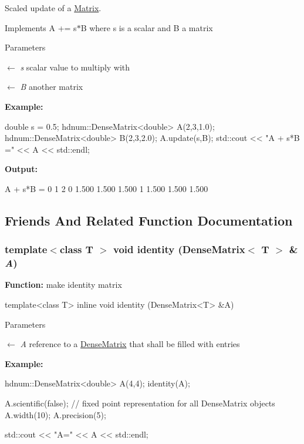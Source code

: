 Scaled update of a \hyperlink{classhdnum_1_1Matrix}{Matrix}. 

Implements A += s$\ast$B where s is a scalar and B a matrix


\begin{DoxyParams}{Parameters}
\item[\mbox{$\leftarrow$} {\em s}]scalar value to multiply with \item[\mbox{$\leftarrow$} {\em B}]another matrix\end{DoxyParams}
{\bfseries Example:} 
\begin{DoxyCode}
          double s = 0.5;
          hdnum::DenseMatrix<double> A(2,3,1.0);
          hdnum::DenseMatrix<double> B(2,3,2.0);
          A.update(s,B);
          std::cout << "A + s*B =" << A << std::endl;
\end{DoxyCode}


{\bfseries Output:} \begin{DoxyVerb}
A + s*B =
                      0          1          2 
          0       1.500      1.500      1.500 
          1       1.500      1.500      1.500 
	  \end{DoxyVerb}
 

\subsection{Friends And Related Function Documentation}
\hypertarget{classhdnum_1_1DenseMatrix_a7827fbef0d569f0b605a6a260e1571f3}{
\subsubsection[{identity}]{\setlength{\rightskip}{0pt plus 5cm}template$<$class T $>$ void identity ({\bf DenseMatrix}$<$ T $>$ \& {\em A})}}
\label{classhdnum_1_1DenseMatrix_a7827fbef0d569f0b605a6a260e1571f3}
\par
 {\bfseries Function:} make identity matrix 
\begin{DoxyCode}
  template<class T>
  inline void identity (DenseMatrix<T> &A)
\end{DoxyCode}
 
\begin{DoxyParams}{Parameters}
\item[\mbox{$\leftarrow$} {\em A}]reference to a \hyperlink{classhdnum_1_1DenseMatrix}{DenseMatrix} that shall be filled with entries\end{DoxyParams}
{\bfseries Example:} 
\begin{DoxyCode}
  hdnum::DenseMatrix<double> A(4,4);
  identity(A);

  A.scientific(false); // fixed point representation for all DenseMatrix objects
  A.width(10);
  A.precision(5);

  std::cout << "A=" << A << std::endl;
\end{DoxyCode}


